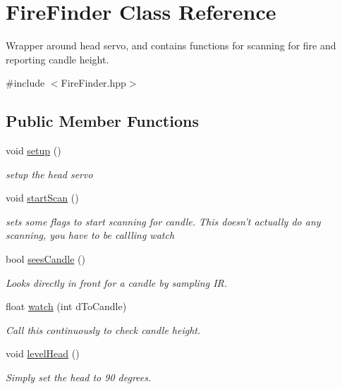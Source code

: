 \hypertarget{classFireFinder}{\section{Fire\-Finder Class Reference}
\label{classFireFinder}
}


Wrapper around head servo, and contains functions for scanning for fire and reporting candle height.  




{\ttfamily \#include $<$Fire\-Finder.\-hpp$>$}

\subsection*{Public Member Functions}
\begin{DoxyCompactItemize}
\item 
void \hyperlink{classFireFinder_aaa2beb5a87e2d9dbd83c0dee1f4f1ef0}{setup} ()
\begin{DoxyCompactList}\small\item\em setup the head servo \end{DoxyCompactList}\item 
void \hyperlink{classFireFinder_ab2cddefdf1200e176231a601a3a1ede3}{start\-Scan} ()
\begin{DoxyCompactList}\small\item\em sets some flags to start scanning for candle. This doesn't actually do any scanning, you have to be callling watch \end{DoxyCompactList}\item 
bool \hyperlink{classFireFinder_afa2879ee6ace8a6b5e298c4186df6178}{sees\-Candle} ()
\begin{DoxyCompactList}\small\item\em Looks directly in front for a candle by sampling I\-R. \end{DoxyCompactList}\item 
float \hyperlink{classFireFinder_afbdb8a5938750d5091becec74fc1f907}{watch} (int d\-To\-Candle)
\begin{DoxyCompactList}\small\item\em Call this continuously to check candle height. \end{DoxyCompactList}\item 
void \hyperlink{classFireFinder_ad0ce95ec7a5858be9b80a3c103120008}{level\-Head} ()
\begin{DoxyCompactList}\small\item\em Simply set the head to 90 degrees. \end{DoxyCompactList}\end{DoxyCompactItemize}
